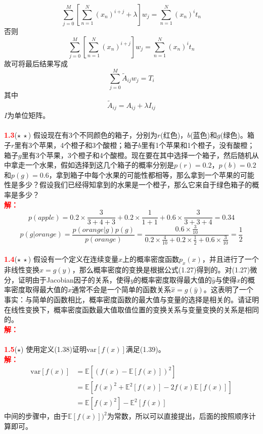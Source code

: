 \documentclass{book}
\numberwithin{equation}{chapter}
\newcommand {\solution} {\textcolor{red}{\textbf{解：}}}
\begin{document}
{	\[
		\sum_{j=0}^M\left[\sum_{n=1}^N(x_n)^{i+j}+\lambda\right]w_j=\sum_{n=1}^N(x_n)^it_n
	\]
	否则
	\[
		\sum_{j=0}^M\left[\sum_{n=1}^N(x_n)^{i+j}\right]w_j=\sum_{n=1}^N(x_n)^it_n
	\]
	故可将最后结果写成
	\[
		\sum_{j=0}^M \widetilde{A}_{ij}w_j = T_i
	\]
	其中
	\[
		\widetilde{A}_{ij}=A_{ij}+\lambda I_{ij}
	\]
	$I$为单位矩阵。\\
	\\
	\textcolor{red}{\textbf{1.3}}\quad ($\star \  \star$) 假设现在有3个不同颜色的箱子，分别为$r$(红色)，$b$(蓝色)和$g$(绿色)。箱子$r$里有3个苹果，4个橙子和3个酸橙；箱子$b$里有1个苹果和1个橙子，没有酸橙；箱子$g$里有3个苹果，3个橙子和4个酸橙。现在要在其中选择一个箱子，然后随机从中拿走一个水果，假如选择到这几个箱子的概率分别是$p(r)=0.2$，$p(b)=0.2$和$p(g)=0.6$，拿到箱子中每个水果的可能性都相等，那么拿到一个苹果的可能性是多少？假设我们已经得知拿到的水果是一个橙子，那么它来自于绿色箱子的概率是多少？\\
	\solution 
	\[
		p(apple)=0.2 \times\frac{3}{3+4+3} + 0.2 \times \frac{1}{1+1} + 0.6 \times \frac{3}{3+3+4} = 0.34
	\]
	\[
		p(g|orange)=\frac{p(orange|g)p(g)}{p(orange)}=\frac{0.6 \times \frac{3}{10}}{0.2\times\frac{4}{10}+0.2 \times \frac{1}{2} + 0.6 \times \frac{3}{10}}=\frac{1}{2}
	\]
	\\
	\textcolor{red}{\textbf{1.4}}\quad ($\star \  \star$) 假设有一个定义在连续变量$x$上的概率密度函数$p_x(x)$，并且进行了一个非线性变换$x=g(y)$，那么概率密度的变换是根据公式(1.27)得到的。对(1.27)微分，证明由于Jacobian因子的关系，使得$y$的概率密度取得最大值的$\hat{y}$与使得$x$的概率密度取得最大值的$\hat{x}$通常不会是一个简单的函数关系$\hat{x}=g(\hat{y})$。这表明了一个事实：与简单的函数相比，概率密度函数的最大值与变量的选择是相关的。请证明在线性变换下，概率密度函数最大值取值位置的变换关系与变量变换的关系是相同的。\\
	\solution 
	\\
	\\
	\textcolor{red}{\textbf{1.5}}\quad ($\star$) 使用定义(1.38)证明$\mathrm{var}[f(x)]$满足(1.39)。\\
	\solution
	\[
	\begin{split}
		\mathrm{var}[f(x)]&=\mathbb{E}\left[(f(x)-\mathbb{E}[f(x)])^2\right]\\
		&=\mathbb{E}\left[f(x)^2+\mathbb{E}^2[f(x)]-2f(x)\mathbb{E}[f(x)]\right] \\
		&=\mathbb{E}[f(x)^2]-\mathbb{E}^2[f(x)]
	\end{split}	
	\]
	中间的步骤中，由于$\mathbb{E}[f(x)])^2$为常数，所以可以直接提出，后面的按照顺序计算即可。\\
}
\end{document}
